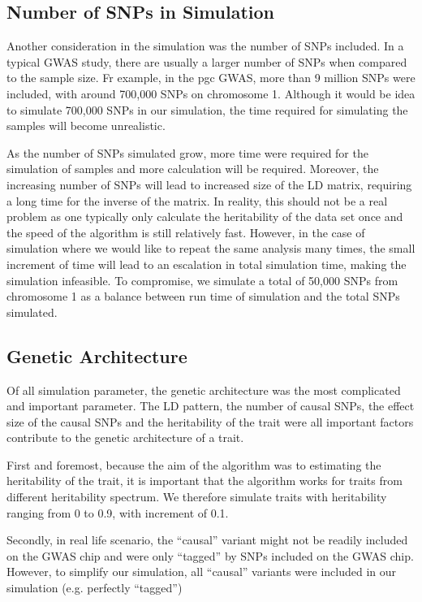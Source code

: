		\subsection{Number of SNPs in Simulation}
		Another consideration in the simulation was the number of \glspl{SNP} included.
		In a typical \gls{GWAS} study, there are usually a larger number of \glspl{SNP} when compared to the sample size. 
		Fr example, in the \gls{pgc}  \gls{GWAS}, more than 9 million \glspl{SNP} were included, with around 700,000 \glspl{SNP} on chromosome 1.
		Although it would be idea to simulate 700,000 \glspl{SNP} in our simulation, the time required for simulating the samples will become unrealistic.
		
		As the number of \glspl{SNP} simulated grow, more time were required for the simulation of samples and more calculation will be required.
		Moreover, the increasing number of \glspl{SNP} will lead to increased size of the \gls{LD} matrix, requiring a long time for the inverse of the matrix.
		In reality, this should not be a real problem as one typically only calculate the heritability of the data set once and the speed of the algorithm is still relatively fast. 
		However, in the case of simulation where we would like to repeat the same analysis many times, the small increment of time will lead to an escalation in total simulation time, making the simulation infeasible. 
		To compromise, we simulate a total of 50,000 \glspl{SNP} from chromosome 1 as a balance between run time of simulation and the total \glspl{SNP} simulated.
		
		\subsection{Genetic Architecture}
		Of all simulation parameter, the genetic architecture was the most complicated and important parameter. 
		The \gls{LD} pattern, the number of causal \glspl{SNP}, the effect size of the causal \glspl{SNP} and the heritability of the trait were all important factors contribute to the genetic architecture of a trait. 
		
		First and foremost, because the aim of the algorithm was to estimating the heritability of the trait, it is important that the algorithm works for traits from different heritability spectrum.
		We therefore simulate traits with heritability ranging from 0 to 0.9, with increment of 0.1.
		
		Secondly, in real life scenario, the ``causal'' variant might not be readily included on the \gls{GWAS} chip and were only ``tagged'' by \glspl{SNP} included on the \gls{GWAS} chip.
		However, to simplify our simulation, all ``causal'' variants were included in our simulation (e.g. perfectly ``tagged'')
		

